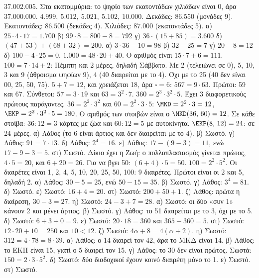  $37.002.005$. Στα εκατομμύρια: το ψηφίο των εκατοντάδων χιλιάδων είναι 0, άρα $37.000.000$.
 $4.999,\ 5.012,\ 5.021,\ 5.102,\ 10.000$.
 Δεκάδες: $86.550$ (μονάδες 9). Εκατοντάδες: $86.500$ (δεκάδες 4). Χιλιάδες: $87.000$ (εκατοντάδες 5).
 α) $25\cdot 4\cdot 17=1.700$ \quad β) $99\cdot 8=800-8=792$ \quad γ) $36\cdot(15+85)=3.600$ \quad δ) $(47+53)+(68+32)=200$.
 α) $3\cdot 36-10=98$ \quad β) $32-25=7$ \quad γ) $20-8=12$ \quad δ) $100-4\cdot 25=0$.
 $1.000=48\cdot 20+40$. Ο αριθμός είναι $15\cdot 7+6=111$.
 $100=7\cdot 14+2$: Πέμπτη και 2 μέρες, δηλαδή Σάββατο.
 Με 2 (τελειώνει σε 0), 5, 10, 3 και 9 (άθροισμα ψηφίων 9), 4 (40 διαιρείται με το 4). Όχι με το 25 (40 δεν είναι 00, 25, 50, 75).
 $5+7=12$, και χρειάζεται 18, άρα $\square=6$: $567=9\cdot 63$.
 Πρώτοι: 59 και 67. Σύνθετοι: $57=3\cdot 19$ και $63=3^2\cdot 7$.
 $360=2^3\cdot 3^2\cdot 5$. Έχει 3 διαφορετικούς πρώτους παράγοντες.
 $36=2^2\cdot 3^2$ και $60=2^2\cdot 3\cdot 5$: $\MKD=2^2\cdot 3=12$, $\EKP=2^2\cdot 3^2\cdot 5=180$.
 Ο αριθμός των στοιβών είναι ο $\MKD(36,\,60)=12$. Σε κάθε στοίβα: $36:12=3$ κάρτες με ζώα και $60:12=5$ με αυτοκίνητα.
 $\EKP(8,\,12)=24$: σε 24 μέρες.
 α) Λάθος (το 6 είναι άρτιος και δεν διαιρείται με το 4). β) Σωστό. γ) Λάθος: $91=7\cdot 13$. δ) Λάθος: $2^4=16$. ε) Λάθος: $17-(9-3)=11$, ενώ $17-9-3=5$. στ) Σωστό.
 Δίκιο έχει η Ζωή: ο πολλαπλασιασμός γίνεται πρώτος, $4\cdot 5=20$, και $6+20=26$. Για να βγει 50: $(6+4)\cdot 5=50$.
 $100=2^2\cdot 5^2$. Οι διαιρέτες είναι 1, 2, 4, 5, 10, 20, 25, 50, 100: 9 διαιρέτες. Πρώτοι είναι οι 2 και 5, δηλαδή 2.
 α) Λάθος: $30-5=25$, ενώ $50-15=35$. β) Σωστό. γ) Λάθος: $3^4=81$. δ) Σωστό. ε) Σωστό: $16+4=20$. στ) Σωστό: $200+50+1$. ζ) Λάθος: πρώτα η διαίρεση, $30-3=27$. η) Σωστό: $24-3+7=28$.
 α) Σωστό: οι δύο «συν 1» κάνουν 2 και μένει άρτιος. β) Σωστό. γ) Λάθος: το 51 διαιρείται με το 3, όχι με το 5. δ) Σωστό: $6+3+0=9$. ε) Σωστό: $20\cdot 18=360$ και $365-360=5$. στ) Σωστό: $12\cdot 20+10=250$ και $10<12$. ζ) Σωστό: $4\alpha+8=4(\alpha+2)$. η) Σωστό: $312=4\cdot 78=8\cdot 39$.
 α) Λάθος: ο 14 διαιρεί τον 42, άρα το ΜΚΔ είναι 14. β) Λάθος: το ΕΚΠ είναι 15, γιατί ο 5 διαιρεί τον 15. γ) Λάθος: το 30 δεν είναι πρώτος. Σωστά: $150=2\cdot 3\cdot 5^2$. δ) Σωστό: δύο διαδοχικοί έχουν κοινό διαιρέτη μόνο το 1. ε) Σωστό. στ) Σωστό.
